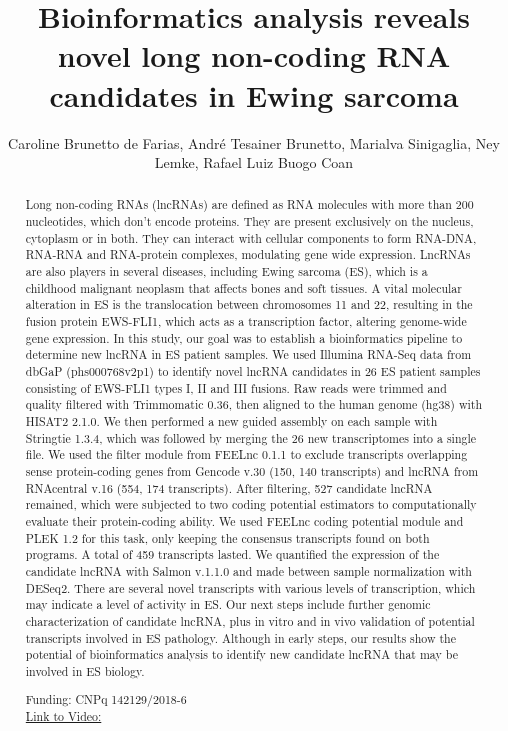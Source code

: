 \documentclass[twoside]{article}
\title{\vspace{-15mm}\fontsize{24pt}{10pt}\selectfont\textbf{ Bioinformatics analysis reveals novel long non-coding RNA candidates in Ewing sarcoma }} %
\author{ Caroline Brunetto de Farias,  Andr\'e Tesainer Brunetto,  Marialva Sinigaglia,  Ney Lemke,  Rafael Luiz Buogo Coan }
\affil{ UNIVERSIDADE ESTADUAL PAULISTA J\'ULIO DE MESQUITA FILHO,  ICI - Instituto do C\^ancer Infantil }
\date{}
\begin{document}
  
  
  \maketitle %
  
  
  \thispagestyle{fancy} %
  
  
  \begin{abstract}
  Long non-coding RNAs (lncRNAs) are defined as RNA molecules with more than 200 nucleotides,  which don't encode proteins. They are present exclusively on the nucleus,  cytoplasm or in both. They can interact with cellular components to form RNA-DNA,  RNA-RNA and RNA-protein complexes,  modulating gene wide expression. LncRNAs are also players in several diseases,  including Ewing sarcoma (ES),  which is a childhood malignant neoplasm that affects bones and soft tissues. A vital molecular alteration in ES is the translocation between chromosomes 11 and 22,  resulting in the fusion protein EWS-FLI1,  which acts as a transcription factor,  altering genome-wide gene expression. In this study,  our goal was to establish a bioinformatics pipeline to determine new lncRNA in ES patient samples. We used Illumina RNA-Seq data from dbGaP (phs000768v2p1) to identify novel lncRNA candidates in 26 ES patient samples consisting of EWS-FLI1 types I,  II and III fusions. Raw reads were trimmed and quality filtered with Trimmomatic 0.36,  then aligned to the human genome (hg38) with HISAT2 2.1.0. We then performed a new guided assembly on each sample with Stringtie 1.3.4,  which was followed by merging the 26 new transcriptomes into a single file. We used the filter module from FEELnc 0.1.1 to exclude transcripts overlapping sense protein-coding genes from Gencode v.30 (150, 140 transcripts) and lncRNA from RNAcentral v.16 (554, 174 transcripts). After filtering,  527 candidate lncRNA remained,  which were subjected to two coding potential estimators to computationally evaluate their protein-coding ability. We used FEELnc coding potential module and PLEK 1.2 for this task,  only keeping the consensus transcripts found on both programs. A total of 459 transcripts lasted. We quantified the expression of the candidate lncRNA with Salmon v.1.1.0 and made between sample normalization with DESeq2. There are several novel transcripts with various levels of transcription,  which may indicate a level of activity in ES. Our next steps include further genomic characterization of candidate lncRNA,  plus in vitro and in vivo validation of potential transcripts involved in ES pathology. Although in early steps,  our results show the potential of bioinformatics analysis to identify new candidate lncRNA that may be involved in ES biology.
  
  Funding: CNPq 142129/2018-6 \\
  \href{http://ab3c.org.br/xpress_pres2020/xmxp2020-303082.html}{Link to Video:}

  \end{abstract}
   
  
\end{document}
